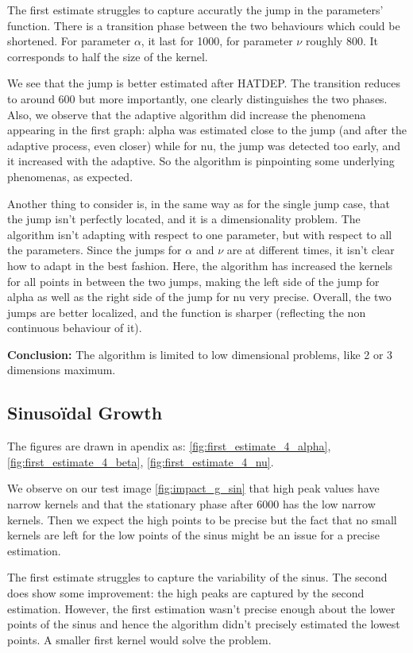 \documentclass[11pt]{book}
\begin{document}
The first estimate struggles to capture accuratly the jump in the parameters' function. There is a transition phase between the two behaviours which could be shortened. For parameter $\alpha$, it last for 1000, for parameter $\nu$ roughly 800. It corresponds to half the size of the kernel.

We see that the jump is better estimated after HATDEP. The transition reduces to around 600 but more importantly, one clearly distinguishes the two phases. Also, we observe that the adaptive algorithm did increase the phenomena appearing in the first graph: alpha was estimated close to the jump (and after the adaptive process, even closer) while for nu, the jump was detected too early, and it increased with the adaptive. So the algorithm is pinpointing some underlying phenomenas, as expected.

Another thing to consider is, in the same way as for the single jump case, that the jump isn't perfectly located, and it is a dimensionality problem. The algorithm isn't adapting with respect to one parameter, but with respect to all the parameters. Since the jumps for $\alpha$ and $\nu$ are at different times, it isn't clear how to adapt in the best fashion. Here, the algorithm has increased the kernels for all points in between the two jumps, making the left side of the jump for alpha as well as the right side of the jump for nu very precise. Overall, the two jumps are better localized, and the function is sharper (reflecting the non continuous behaviour of it).

\textbf{Conclusion:} The algorithm is limited to low dimensional problems, like 2 or 3 dimensions maximum.

\subsection{Sinusoïdal Growth}
The figures are drawn in apendix as: \ref{fig:first_estimate_4_alpha}, \ref{fig:first_estimate_4_beta}, \ref{fig:first_estimate_4_nu}.

We observe on our test image \ref{fig:impact_g_sin} that high peak values have narrow kernels and that the stationary phase after 6000 has the low narrow kernels. Then we expect the high points to be precise but the fact that no small kernels are left for the low points of the sinus might be an issue for a precise estimation.


The first estimate struggles to capture the variability of the sinus. The second does show some improvement: the high peaks are captured by the second estimation. However, the first estimation wasn't precise enough about the lower points of the sinus and hence the algorithm didn't precisely estimated the lowest points. A smaller first kernel would solve the problem. 
\end{document}

